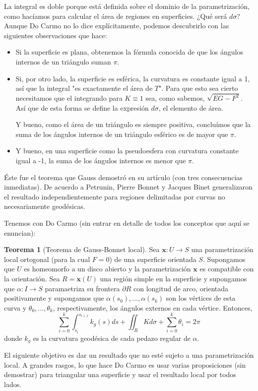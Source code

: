 \documentclass[spanish]{book}
\theoremstyle{definition}
\newtheorem*{teo}{Teorema}
\begin{document}
La integral es doble porque está definida sobre el dominio de la parametrización, como hacíamos para calcular el área de regiones en superficies. ¿Qué será $d\sigma$? Aunque Do Carmo no lo dice explícitamente, podemos descubrirlo con las siguientes observaciones que hace:
\begin{itemize}
	\item Si la superficie es plana, obtenemos la fórmula conocida de que los ángulos internos de un triángulo suman $\pi$.
	\item Si, por otro lado, la superficie es esférica, la curvatura es constante igual a 1, así que la integral "es exactamente el área de $T$". Para que esto sea cierto necesitamos que el integrando para $K\equiv1$ sea, como sabemos, $\sqrt{EG-F^2}$. Así que de esta forma se define la expresión $d\sigma$, el elemento de área.
	
	Y bueno, como el área de un triángulo es siempre positiva, concluímos que la suma de los ángulos internos de un triángulo esférico es de mayor que $\pi$.
	\item Y bueno, en una superficie como la pseudoesfera con curvatura constante igual a -1, la suma de los ángulos internos es menor que $\pi$.
\end{itemize}
Éste fue el teorema que Gauss demostró en su artículo (con tres consecuencias inmediatas). De acuerdo a Petrunin, Pierre Bonnet y Jacques Binet generalizaron el resultado independientemente para regiones delimitadas por curvas no necesariamente geodésicas.

Tenemos con Do Carmo (sin entrar en detalle de todos los conceptos que aquí se enuncian):
\begin{teo}[Teorema de Gauss-Bonnet local]
	Sea $\mathbf x: U\to S$ una parametrización local ortogonal (para la cual $F=0$) de una superficie orientada $S$. Supongamos que $U$ es homeomorfo a un disco abierto y la parametrización $\mathbf x$ es compatible con la orientación. Sea $R=\mathbf x(U)$ una región simple en la superficie y supongamos que $\alpha:I\to S$ paramaetriza su frontera $\partial R$ con longitud de arco, orientada positivamente y supongamos que $\alpha(s_0),...,\alpha(s_k)$ son los vértices de esta curva y $\theta_0,...,\theta_k$, respectivamente, los ángulos externos en cada vértice.
	Entonces,
	\[\sum_{i=0}^k\int_{s_i}^{s_{i+1}} k_g(s)ds+\iint_R Kd\sigma+\sum_{i=0}^k\theta_i=2\pi\]
	donde $k_g$ es la curvatura geodésica de cada pedazo regular de $\alpha$.
\end{teo}
El siguiente objetivo es dar un resultado que no esté sujeto a una parametrización local. A grandes rasgos, lo que hace Do Carmo es usar varias proposiciones (sin demostrar) para triangular una superficie y usar el resultado local por todos lados.
\end{document}
